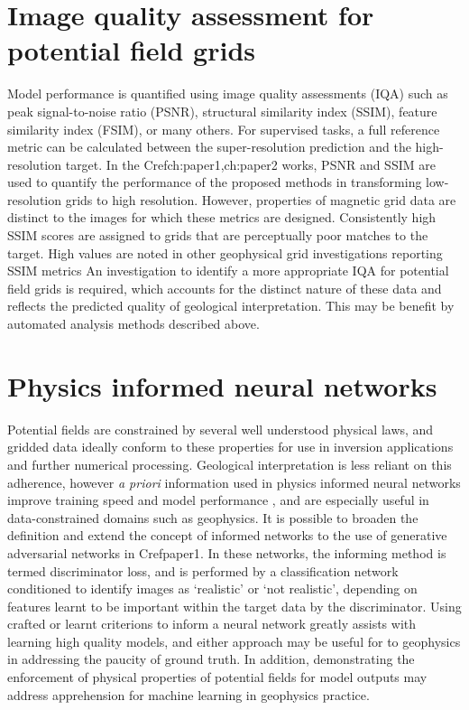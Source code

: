 \documentclass[manuscript.tex]{subfiles}
\begin{document}
\section{Image quality assessment for potential field grids}
Model performance is quantified using image quality assessments (IQA) such as peak signal-to-noise ratio (PSNR), structural similarity index (SSIM), feature similarity index (FSIM), or many others.
For supervised tasks, a full reference metric can be calculated between the super-resolution prediction and the high-resolution target.
In the Cref{ch:paper1,ch:paper2} works, PSNR and SSIM are used to quantify the performance of the proposed methods in transforming low-resolution grids to high resolution.
However, properties of magnetic grid data are distinct to the images for which these metrics are designed.
Consistently high SSIM scores are assigned to grids that are perceptually poor matches to the target.
High values are noted in other geophysical grid investigations reporting SSIM metrics \parencite{wangDeeplearningbasedSeismicData2018,bavandsavadkoohiHighresolutionAeromagneticMap2023}
An investigation to identify a more appropriate IQA for potential field grids is required, which accounts for the distinct nature of these data and reflects the predicted quality of geological interpretation.
This may be benefit by automated analysis methods described above.

\section{Physics informed neural networks}
Potential fields are constrained by several well understood physical laws, and gridded data ideally conform to these properties for use in inversion applications and further numerical processing.
Geological interpretation is less reliant on this adherence, however \emph{a priori} information used in physics informed neural networks improve training speed and model performance \parencite{raissiPhysicsinformedNeuralNetworks2019}, and are especially useful in data-constrained domains such as geophysics.
It is possible to broaden the definition and extend the concept of informed networks to the use of generative adversarial networks in Cref{paper1}.
In these networks, the informing method is termed discriminator loss, and is performed by a classification network conditioned to identify images as `realistic' or `not realistic', depending on features learnt to be important within the target data by the discriminator.
Using crafted or learnt criterions to inform a neural network greatly assists with learning high quality models, and either approach may be useful for to geophysics in addressing the paucity of ground truth.
In addition, demonstrating the enforcement of physical properties of potential fields for model outputs may address apprehension for machine learning in geophysics practice.
\end{document}
